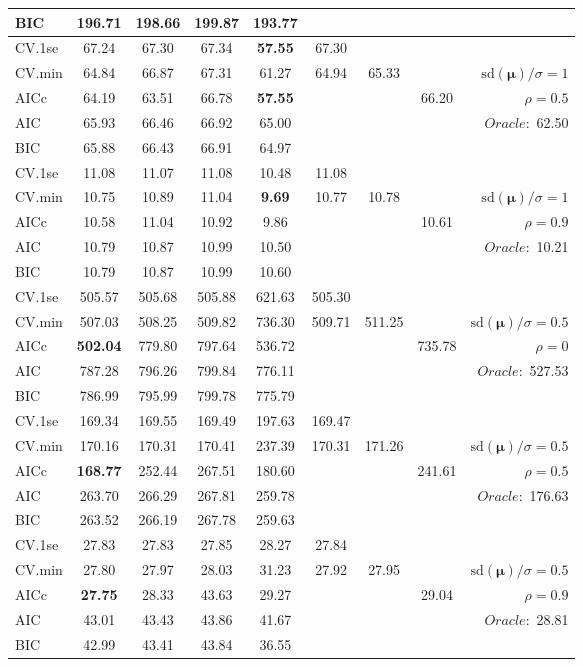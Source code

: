 \begin{table}
\begin{center}
\begin{tabular}{l*{7}{c}|r}
BIC & 196.71 & 198.66 & 199.87 & 193.77 & & & &  \\
 \hline 
CV.1se & 67.24 & 67.30 & 67.34 & {\bf 57.55} & 67.30 & & & \\
CV.min & 64.84 & 66.87 & 67.31 & 61.27 & 64.94 & 65.33 & & $\mathrm{sd}(\mathbf{\mu})/\sigma=1$ \\
AICc & 64.19 & 63.51 & 66.78 & {\bf 57.55} & & & 66.20 &  $\rho=0.5$ \\
AIC & 65.93 & 66.46 & 66.92 & 65.00 & & & &  \multirow{2}{*}{$Oracle: $ 62.50} \\
BIC & 65.88 & 66.43 & 66.91 & 64.97 & & & &  \\
 \hline 
CV.1se & 11.08 & 11.07 & 11.08 & 10.48 & 11.08 & & & \\
CV.min & 10.75 & 10.89 & 11.04 & {\bf 9.69} & 10.77 & 10.78 & & $\mathrm{sd}(\mathbf{\mu})/\sigma=1$ \\
AICc & 10.58 & 11.04 & 10.92 & 9.86 & & & 10.61 &  $\rho=0.9$ \\
AIC & 10.79 & 10.87 & 10.99 & 10.50 & & & &  \multirow{2}{*}{$Oracle: $ 10.21} \\
BIC & 10.79 & 10.87 & 10.99 & 10.60 & & & &  \\
 \hline 
CV.1se & 505.57 & 505.68 & 505.88 & 621.63 & 505.30 & & & \\
CV.min & 507.03 & 508.25 & 509.82 & 736.30 & 509.71 & 511.25 & & $\mathrm{sd}(\mathbf{\mu})/\sigma=0.5$ \\
AICc & {\bf 502.04} & 779.80 & 797.64 & 536.72 & & & 735.78 &  $\rho=0$ \\
AIC & 787.28 & 796.26 & 799.84 & 776.11 & & & &  \multirow{2}{*}{$Oracle: $ 527.53} \\
BIC & 786.99 & 795.99 & 799.78 & 775.79 & & & &  \\
 \hline 
CV.1se & 169.34 & 169.55 & 169.49 & 197.63 & 169.47 & & & \\
CV.min & 170.16 & 170.31 & 170.41 & 237.39 & 170.31 & 171.26 & & $\mathrm{sd}(\mathbf{\mu})/\sigma=0.5$ \\
AICc & {\bf 168.77} & 252.44 & 267.51 & 180.60 & & & 241.61 &  $\rho=0.5$ \\
AIC & 263.70 & 266.29 & 267.81 & 259.78 & & & &  \multirow{2}{*}{$Oracle: $ 176.63} \\
BIC & 263.52 & 266.19 & 267.78 & 259.63 & & & &  \\
 \hline 
CV.1se & 27.83 & 27.83 & 27.85 & 28.27 & 27.84 & & & \\
CV.min & 27.80 & 27.97 & 28.03 & 31.23 & 27.92 & 27.95 & & $\mathrm{sd}(\mathbf{\mu})/\sigma=0.5$ \\
AICc & {\bf 27.75} & 28.33 & 43.63 & 29.27 & & & 29.04 &  $\rho=0.9$ \\
AIC & 43.01 & 43.43 & 43.86 & 41.67 & & & &  \multirow{2}{*}{$Oracle: $ 28.81} \\
BIC & 42.99 & 43.41 & 43.84 & 36.55 & & & &  \\
 \hline 
\end{tabular}
\end{center}
\vspace{-1cm}
\end{table}




